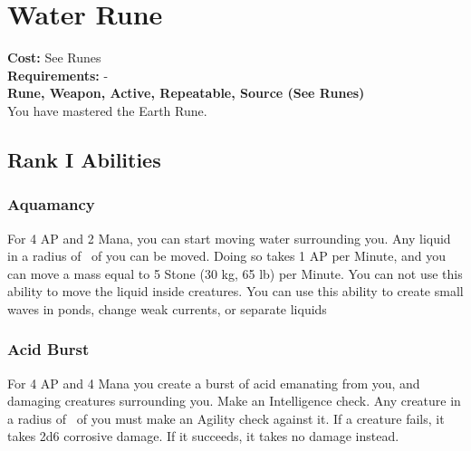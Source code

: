 \section{Water Rune}\label{rune:water}
\textbf{Cost:} See Runes\\
\textbf{Requirements:} -\\
\textbf{Rune, Weapon, Active, Repeatable, Source (See Runes)}\\
You have mastered the Earth Rune.

\subsection{Rank I Abilities}

\subsubsection{Aquamancy}
For 4 AP and 2 Mana, you can start moving water surrounding you.
Any liquid in a radius of~ of you can be moved.
Doing so takes 1 AP per Minute, and you can move a mass equal to 5 Stone (30 kg, 65 lb) per Minute.
You can not use this ability to move the liquid inside creatures.
You can use this ability to create small waves in ponds, change weak currents, or separate liquids

\subsubsection{Acid Burst}
For 4 AP and 4 Mana you create a burst of acid emanating from you, and damaging creatures surrounding you.
Make an Intelligence check.
Any creature in a radius of~ of you must make an Agility check against it.
If a creature fails, it takes 2d6 corrosive damage.
If it succeeds, it takes no damage instead.
